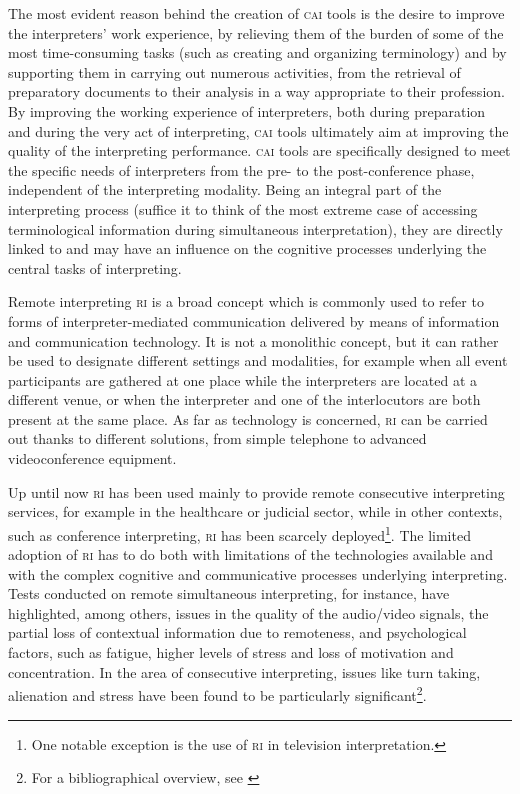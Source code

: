 \documentclass[output=paper]{langsci/langscibook}
\begin{document}
The most evident reason behind the creation of \textsc{cai} tools is the desire to improve the interpreters’ work experience, by relieving them of the burden of some of the most time-consuming tasks (such as creating and organizing terminology) and by supporting them in carrying out numerous activities, from the retrieval of preparatory documents to their analysis in a way appropriate to their profession. By improving the working experience of interpreters, both during preparation and during the very act of interpreting, \textsc{cai} tools ultimately aim at improving the quality of the interpreting performance. \textsc{cai} tools are specifically designed to meet the specific needs of interpreters from the pre- to the post-conference phase, independent of the interpreting modality. Being an integral part of the interpreting process (suffice it to think of the most extreme case of accessing terminological information during simultaneous interpretation), they are directly linked to and may have an influence on the cognitive processes underlying the central tasks of interpreting. %
 
Remote interpreting \textsc{ri} is a broad concept which is commonly used to refer to forms of interpreter-mediated communication delivered by means of information and communication technology. It is not a monolithic concept, but it can rather be used to designate different settings and modalities, for example when all event participants are gathered at one place while the interpreters are located at a different venue, or when the interpreter and one of the interlocutors are both present at the same place. As far as technology is concerned, \textsc{ri} can be carried out thanks to different solutions, from simple telephone to advanced videoconference equipment. 
 
Up until now \textsc{ri} has been used mainly to provide remote consecutive interpreting services, for example in the healthcare or judicial sector, while in other contexts, such as conference interpreting, \textsc{ri} has been scarcely deployed\footnote{One notable exception is the use of \textsc{ri} in television interpretation.}. The limited adoption of \textsc{ri} has to do both with limitations of the technologies available and with the complex cognitive and communicative processes underlying interpreting. Tests conducted on remote simultaneous interpreting, for instance, have highlighted, among others, issues in the quality of the audio/video signals, the partial loss of contextual information due to remoteness, and psychological factors, such as fatigue, higher levels of stress and loss of motivation and concentration. In the area of consecutive interpreting, issues like turn taking, alienation and stress have been found to be particularly significant\footnote{For a bibliographical overview, see \citeauthor{Andres2009} \citeyear{Andres2009}}. 
 
\end{document}
